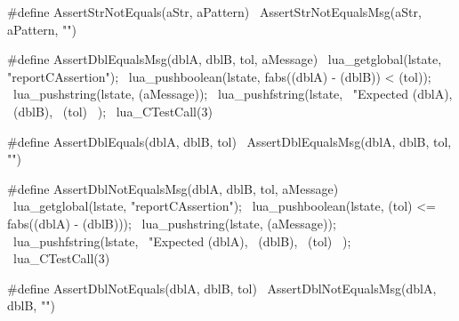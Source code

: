 #define AssertStrNotEquals(aStr, aPattern) \
  AssertStrNotEqualsMsg(aStr, aPattern, "")
\stopCHeader

\stopTestSuite

\startTestSuite[assertDblEquals]

\startCHeader
#define AssertDblEqualsMsg(dblA, dblB, tol, aMessage)        \
  lua_getglobal(lstate, "reportCAssertion");                 \
  lua_pushboolean(lstate, fabs((dblA) - (dblB)) < (tol));    \
  lua_pushstring(lstate, (aMessage));                        \
  lua_pushfstring(lstate,                                    \
      "Expected %
      (dblA),                                                \
      (dblB),                                                \
      (tol)                                                  \
    );                                                       \
  lua_CTestCall(3)

#define AssertDblEquals(dblA, dblB, tol) \
  AssertDblEqualsMsg(dblA, dblB, tol, "")
\stopCHeader

\stopTestSuite

\startTestSuite[assertDblNotEqals]

\startCHeader
#define AssertDblNotEqualsMsg(dblA, dblB, tol, aMessage)         \
  lua_getglobal(lstate, "reportCAssertion");                     \
  lua_pushboolean(lstate, (tol) <= fabs((dblA) - (dblB)));       \
  lua_pushstring(lstate, (aMessage));                            \
  lua_pushfstring(lstate,                                        \
      "Expected %
      (dblA),                                                    \
      (dblB),                                                    \
      (tol)                                                      \
    );                                                           \
  lua_CTestCall(3)

#define AssertDblNotEquals(dblA, dblB, tol) \
  AssertDblNotEqualsMsg(dblA, dblB, "")
\stopCHeader

\stopTestSuite
